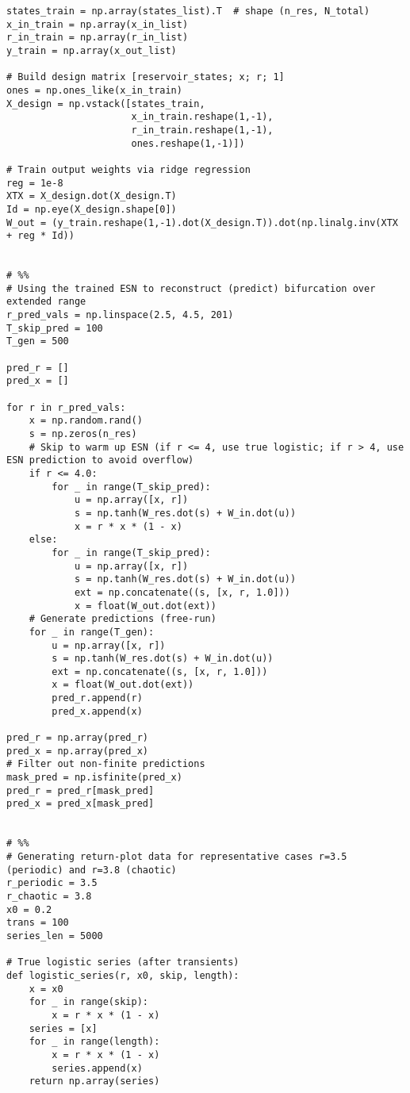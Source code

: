 \begin{verbatim}
states_train = np.array(states_list).T  # shape (n_res, N_total)
x_in_train = np.array(x_in_list)
r_in_train = np.array(r_in_list)
y_train = np.array(x_out_list)

# Build design matrix [reservoir_states; x; r; 1]
ones = np.ones_like(x_in_train)
X_design = np.vstack([states_train,
                      x_in_train.reshape(1,-1),
                      r_in_train.reshape(1,-1),
                      ones.reshape(1,-1)])

# Train output weights via ridge regression
reg = 1e-8
XTX = X_design.dot(X_design.T)
Id = np.eye(X_design.shape[0])
W_out = (y_train.reshape(1,-1).dot(X_design.T)).dot(np.linalg.inv(XTX + reg * Id))


# %%
# Using the trained ESN to reconstruct (predict) bifurcation over extended range
r_pred_vals = np.linspace(2.5, 4.5, 201)
T_skip_pred = 100
T_gen = 500

pred_r = []
pred_x = []

for r in r_pred_vals:
    x = np.random.rand()
    s = np.zeros(n_res)
    # Skip to warm up ESN (if r <= 4, use true logistic; if r > 4, use ESN prediction to avoid overflow)
    if r <= 4.0:
        for _ in range(T_skip_pred):
            u = np.array([x, r])
            s = np.tanh(W_res.dot(s) + W_in.dot(u))
            x = r * x * (1 - x)
    else:
        for _ in range(T_skip_pred):
            u = np.array([x, r])
            s = np.tanh(W_res.dot(s) + W_in.dot(u))
            ext = np.concatenate((s, [x, r, 1.0]))
            x = float(W_out.dot(ext))
    # Generate predictions (free-run)
    for _ in range(T_gen):
        u = np.array([x, r])
        s = np.tanh(W_res.dot(s) + W_in.dot(u))
        ext = np.concatenate((s, [x, r, 1.0]))
        x = float(W_out.dot(ext))
        pred_r.append(r)
        pred_x.append(x)

pred_r = np.array(pred_r)
pred_x = np.array(pred_x)
# Filter out non-finite predictions
mask_pred = np.isfinite(pred_x)
pred_r = pred_r[mask_pred]
pred_x = pred_x[mask_pred]


# %%
# Generating return-plot data for representative cases r=3.5 (periodic) and r=3.8 (chaotic)
r_periodic = 3.5
r_chaotic = 3.8
x0 = 0.2
trans = 100
series_len = 5000

# True logistic series (after transients)
def logistic_series(r, x0, skip, length):
    x = x0
    for _ in range(skip):
        x = r * x * (1 - x)
    series = [x]
    for _ in range(length):
        x = r * x * (1 - x)
        series.append(x)
    return np.array(series)


\end{verbatim}
